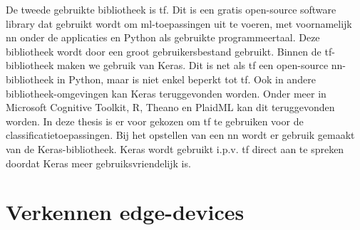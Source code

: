 De tweede gebruikte bibliotheek is \gls{tf}. Dit is een gratis open-source software library dat gebruikt wordt om \gls{ml}-toepassingen uit te voeren, met voornamelijk \gls{nn} onder de applicaties en Python als gebruikte programmeertaal. Deze bibliotheek wordt door een groot gebruikersbestand gebruikt. Binnen de \gls{tf}-bibliotheek maken we gebruik van Keras. Dit is net als \gls{tf} een open-source \gls{nn}-bibliotheek in Python, maar is niet enkel beperkt tot \gls{tf}. Ook in andere bibliotheek-omgevingen kan Keras teruggevonden worden. Onder meer in Microsoft Cognitive Toolkit, R, Theano en PlaidML kan dit teruggevonden worden\cite{bron:kerasbackend}. In deze thesis is er voor gekozen om \gls{tf} te gebruiken voor de classificatietoepassingen. Bij het opstellen van een \gls{nn} wordt er gebruik gemaakt van de Keras-bibliotheek. Keras wordt gebruikt i.p.v. \gls{tf} direct aan te spreken doordat Keras meer gebruiksvriendelijk is.

\newpage

\section{Verkennen edge-devices}

